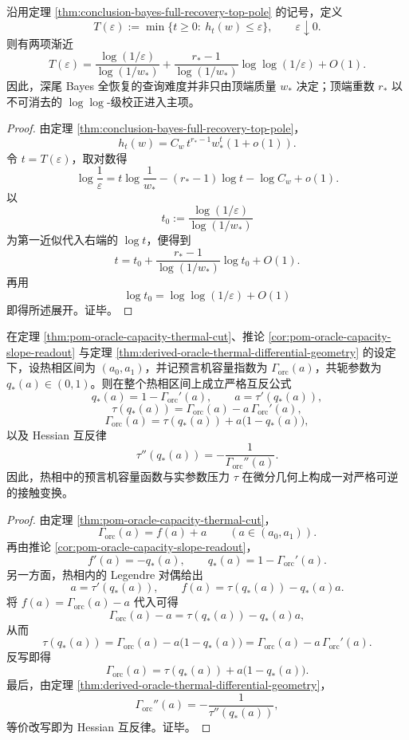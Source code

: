 \begin{corollary}[深尾查询制度的双参数对数律]\label{cor:conclusion-bayes-deep-tail-two-parameter-log-law}
沿用定理 \ref{thm:conclusion-bayes-full-recovery-top-pole} 的记号，定义
\[
T(\varepsilon):=\min\{t\ge 0:\ h_t(w)\le \varepsilon\},
\qquad
\varepsilon\downarrow 0.
\]
则有两项渐近
\[
T(\varepsilon)
=
\frac{\log(1/\varepsilon)}{\log(1/w_\ast)}
+
\frac{r_\ast-1}{\log(1/w_\ast)}\log\log(1/\varepsilon)
+
O(1).
\]
因此，深尾 Bayes 全恢复的查询难度并非只由顶端质量 \(w_\ast\) 决定；顶端重数 \(r_\ast\) 以不可消去的 \(\log\log\)-级校正进入主项。
\end{corollary}
\begin{proof}
由定理 \ref{thm:conclusion-bayes-full-recovery-top-pole}，
\[
h_t(w)=C_w\,t^{r_\ast-1}w_\ast^t(1+o(1)).
\]
令 \(t=T(\varepsilon)\)，取对数得
\[
\log\frac{1}{\varepsilon}
=
t\log\frac{1}{w_\ast}
-(r_\ast-1)\log t
-\log C_w
+o(1).
\]
以
\[
t_0:=\frac{\log(1/\varepsilon)}{\log(1/w_\ast)}
\]
为第一近似代入右端的 \(\log t\)，便得到
\[
t
=
t_0+\frac{r_\ast-1}{\log(1/w_\ast)}\log t_0+O(1).
\]
再用
\[
\log t_0=\log\log(1/\varepsilon)+O(1)
\]
即得所述展开。证毕。
\end{proof}

\begin{theorem}[热相预言机容量与压力的严格互反]\label{thm:conclusion-hot-phase-oracle-legendre-reciprocity}
在定理 \ref{thm:pom-oracle-capacity-thermal-cut}、推论 \ref{cor:pom-oracle-capacity-slope-readout} 与定理 \ref{thm:derived-oracle-thermal-differential-geometry} 的设定下，设热相区间为 \((a_0,a_1)\)，并记预言机容量指数为 \(\Gamma_{\mathrm{orc}}(a)\)，共轭参数为 \(q_\ast(a)\in(0,1)\)。则在整个热相区间上成立严格互反公式
\[
q_\ast(a)=1-\Gamma_{\mathrm{orc}}'(a),
\qquad
a=\tau'(q_\ast(a)),
\]
\[
\tau(q_\ast(a))
=
\Gamma_{\mathrm{orc}}(a)-a\,\Gamma_{\mathrm{orc}}'(a),
\]
\[
\Gamma_{\mathrm{orc}}(a)
=
\tau(q_\ast(a))+a\bigl(1-q_\ast(a)\bigr),
\]
以及 Hessian 互反律
\[
\tau''(q_\ast(a))=-\frac{1}{\Gamma_{\mathrm{orc}}''(a)}.
\]
因此，热相中的预言机容量函数与实参数压力 \(\tau\) 在微分几何上构成一对严格可逆的接触变换。
\end{theorem}
\begin{proof}
由定理 \ref{thm:pom-oracle-capacity-thermal-cut}，
\[
\Gamma_{\mathrm{orc}}(a)=f(a)+a
\qquad (a\in(a_0,a_1)).
\]
再由推论 \ref{cor:pom-oracle-capacity-slope-readout}，
\[
f'(a)=-q_\ast(a),
\qquad
q_\ast(a)=1-\Gamma_{\mathrm{orc}}'(a).
\]
另一方面，热相内的 Legendre 对偶给出
\[
a=\tau'(q_\ast(a)),
\qquad
f(a)=\tau(q_\ast(a))-q_\ast(a)a.
\]
将 \(f(a)=\Gamma_{\mathrm{orc}}(a)-a\) 代入可得
\[
\Gamma_{\mathrm{orc}}(a)-a
=
\tau(q_\ast(a))-q_\ast(a)a,
\]
从而
\[
\tau(q_\ast(a))
=
\Gamma_{\mathrm{orc}}(a)-a\bigl(1-q_\ast(a)\bigr)
=
\Gamma_{\mathrm{orc}}(a)-a\,\Gamma_{\mathrm{orc}}'(a).
\]
反写即得
\[
\Gamma_{\mathrm{orc}}(a)
=
\tau(q_\ast(a))+a\bigl(1-q_\ast(a)\bigr).
\]
最后，由定理 \ref{thm:derived-oracle-thermal-differential-geometry}，
\[
\Gamma_{\mathrm{orc}}''(a)=-\frac{1}{\tau''(q_\ast(a))},
\]
等价改写即为 Hessian 互反律。证毕。
\end{proof}

